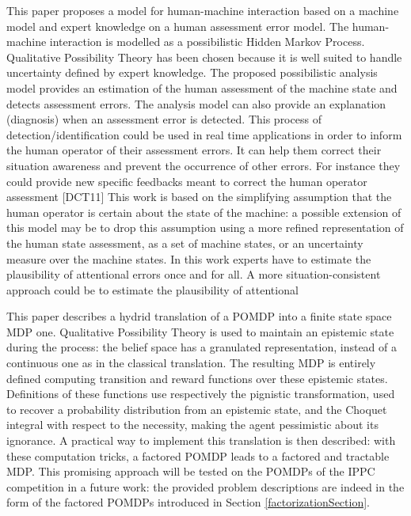 This paper proposes a model for human-machine interaction
based on a machine model and expert knowledge on a human
assessment error model. The human-machine interaction is
modelled as a possibilistic Hidden Markov Process. Qualitative
Possibility Theory has been chosen because it is well suited to
handle uncertainty defined by expert knowledge. The proposed
possibilistic analysis model provides an estimation of the
human assessment of the machine state and detects assessment
errors. The analysis model can also provide an explanation
(diagnosis) when an assessment error is detected.
This process of detection/identification could be used in real
time applications in order to inform the human operator of
their assessment errors. It can help them correct their situation
awareness and prevent the occurrence of other errors. For
instance they could provide new specific feedbacks meant to
correct the human operator assessment [DCT11]
This work is based on the simplifying assumption that the
human operator is certain about the state of the machine:
a possible extension of this model may be to drop this
assumption using a more refined representation of the human
state assessment, as a set of machine states, or an uncertainty
measure over the machine states.
In this work experts have to estimate the plausibility of
attentional errors once and for all. A more situation-consistent
approach could be to estimate the plausibility of attentional

This paper describes a hydrid translation 
of a POMDP into a finite state space MDP one. 
Qualitative Possibility Theory
is used to maintain an epistemic state during the process:
the belief space has a granulated representation,
instead of a continuous one as in the classical translation.
The resulting MDP is entirely defined computing transition and reward functions
over these epistemic states. 
Definitions of these functions 
use respectively the pignistic transformation,
used to recover a probability distribution 
from an epistemic state, 
and the Choquet integral with respect to the necessity, 
making the agent pessimistic about its ignorance. 
A practical way to implement this translation 
is then described:
with these computation tricks, 
a factored POMDP leads to a factored and tractable MDP. 
This promising approach 
will be tested on the POMDPs 
of the IPPC competition \cite{SannerIPPC11} in a future work:
the provided problem descriptions are indeed 
in the form of the factored POMDPs 
introduced in Section \ref{factorizationSection}.


